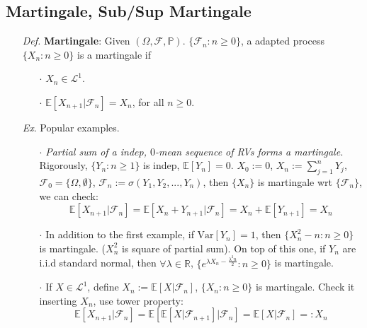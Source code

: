 \documentclass[a4paper,12pt,twoside]{book}
\begin{document}
\subsection{Martingale, Sub/Sup Martingale}
\begin{itemize}
	\item[\textit{Def.}] \textbf{Martingale}: Given $(\Omega, \mathcal{F}, \mathbb{P})$. $\{\mathcal{F}_n:n\geq 0\}$, a adapted process $\{X_n:n\geq 0\}$ is a martingale if
	\begin{itemize}
		\item[$\cdot$] $X_n \in \mathcal{L}^1$.
		\item[$\cdot$] $\mathbb{E}\left[X_{n+1}|\mathcal{F}_n\right] = X_n$, for all $n\geq 0$.
	\end{itemize}

	\item[\textit{Ex}.] Popular examples.
	\begin{itemize}
		\item[$\cdot$] \textit{Partial sum of a indep, $0$-mean sequence of RVs forms a martingale.} Rigorously, $\{Y_n:n\geq 1\}$ is indep, $\mathbb{E}\left[Y_n\right]=0$. $X_0:=0$, $X_n:=\sum_{j=1}^n Y_j$, $\mathcal{F}_0 = \{\Omega, \emptyset\}$, $\mathcal{F}_n:=\sigma(Y_1, Y_2, ..., Y_n)$, then $\{X_n\}$ is martingale wrt $\{\mathcal{F}_n\}$, we can check:
		\begin{equation}
			\mathbb{E}\left[X_{n+1}|\mathcal{F}_n\right]=\mathbb{E}\left[X_n+Y_{n+1}|\mathcal{F}_n\right]=X_n + \mathbb{E}\left[Y_{n+1}\right]=X_n
		\end{equation}

		\item[$\cdot$] In addition to the first example, if $\mathrm{Var}\left[Y_n\right]=1$, then $\{X_n^2 -n : n\geq 0\}$ is martingale. ($X_n^2$ is square of partial sum). On top of this one, if $Y_n$ are i.i.d standard normal, then $\forall \lambda \in \mathbb{R}$, $\{e^{\lambda X_n - \frac{\lambda^2 n}{2}}: n\geq 0\}$ is martingale.

		\item[$\cdot$] If $X \in \mathcal{L}^1$, define $X_n:= \mathbb{E}\left[X|\mathcal{F}_n\right]$, $\{X_n:n\geq 0\}$ is martingale. Check it inserting $X_n$, use tower property:
		\begin{equation}
			\mathbb{E}\left[X_{n+1}|\mathcal{F}_n\right] = \mathbb{E}\left[ \mathbb{E}\left[X|\mathcal{F}_{n+1}\right] |\mathcal{F}_n\right]=\mathbb{E}\left[X|\mathcal{F}_n\right]=:X_n
		\end{equation}
	\end{itemize}


\end{itemize}
\end{document}
